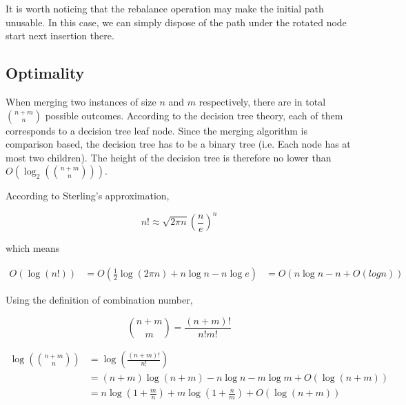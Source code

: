 \documentclass[12pt]{article}
\begin{document}
It is worth noticing that the rebalance operation may make the initial path unusable. In this case, we can simply dispose of the path under the rotated node start next insertion there\cite{brown1979fast}. 


\subsection{Optimality}
 
When merging two instances of size $n$ and $m$ respectively, there are in total $\binom{n+m}{n}$ possible outcomes. According to the decision tree theory, each of them corresponds to a decision tree leaf node. Since the merging algorithm is comparison based, the decision tree has to be a binary tree (i.e. Each node has at most two children). The height of the decision tree is therefore no lower than $O(\log_2({\binom{n+m}{n}}))$.

According to Sterling's approximation, 

\begin{equation}
    n!\approx \sqrt{2\pi n}(\frac{n}{e})^n
\end{equation}

which means

\begin{equation}
    \begin{aligned}
        O(\log(n!)) &= O(\frac{1}{2}\log(2\pi n) + n\log n - n\log e )
                    &= O(n\log n - n + O(log n))
    \end{aligned}
\end{equation}

Using the definition of combination number, 

\begin{equation}
    \binom{n+m}{m} = \frac{(n+m)!}{n!m!}
\end{equation}

\begin{align}
    \log(\binom{n+m}{n}) &= \log(\frac{(n+m)!}{n!})\\
                         &= (n+m)\log(n+m) - n\log n - m\log m + O(\log (n+m))\\
                         &= n\log(1+\frac{m}{n}) + m\log (1+\frac{n}{m}) + O(\log (n+m))
\end{align}
\end{document}
